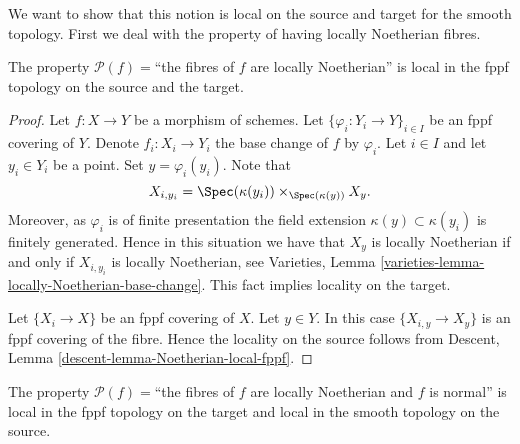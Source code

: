 \noindent
We want to show that this notion is local on the source and target
for the smooth topology. First we deal with the property of having
locally Noetherian fibres.

\begin{lemma}
\label{lemma-locally-Noetherian-fibres-fppf-local-source-and-target}
The property $\mathcal{P}(f)=$``the fibres of $f$ are locally Noetherian''
is local in the fppf topology on the source and the target.
\end{lemma}

\begin{proof}
Let $f : X \to Y$ be a morphism of schemes.
Let $\{\varphi_i : Y_i \to Y\}_{i \in I}$ be an fppf covering of $Y$.
Denote $f_i : X_i \to Y_i$ the base change of $f$ by $\varphi_i$.
Let $i \in I$ and let $y_i \in Y_i$ be a point.
Set $y = \varphi_i(y_i)$. Note that
$$
X_{i, y_i} = \Spec(\kappa(y_i)) \times_{\Spec(\kappa(y))} X_y.
$$
Moreover, as $\varphi_i$ is of finite presentation the field extension
$\kappa(y) \subset \kappa(y_i)$ is finitely generated.
Hence in this situation we have that $X_y$ is locally Noetherian if and
only if $X_{i, y_i}$ is locally Noetherian, see
Varieties, Lemma \ref{varieties-lemma-locally-Noetherian-base-change}.
This fact implies locality on the target.

\medskip\noindent
Let $\{X_i \to X\}$ be an fppf covering of $X$.
Let $y \in Y$. In this case $\{X_{i, y} \to X_y\}$ is an
fppf covering of the fibre. Hence the locality on the source
follows from Descent, Lemma \ref{descent-lemma-Noetherian-local-fppf}.
\end{proof}

\begin{lemma}
\label{lemma-normal-fppf-local-source-and-target}
The property
$\mathcal{P}(f)=$``the fibres of $f$ are locally Noetherian and $f$ is normal''
is local in the fppf topology on the target and
local in the smooth topology on the source.
\end{lemma}

